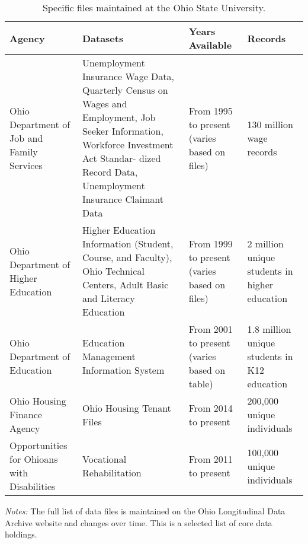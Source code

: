 \begin{table}[t]
\caption{\label{tab:oldatable1}Specific files maintained at the Ohio State University.}\vspace{-2pt}
\fontsize{9}{10}\selectfont
\begin{tabularx}{1\textwidth}{YP{3.7cm}YY}
\toprule
Agency & Datasets & Years Available & Records\\
\midrule
Ohio Department of Job and Family Services& Unemployment Insurance Wage Data, Quarterly Census on Wages and Employment, Job Seeker Information, Workforce Investment Act Standar- dized Record Data, Unemployment Insurance Claimant Data & From 1995 to present (varies based on files) & 130 million wage records\\
Ohio Department of Higher Education & Higher Education Information (Student, Course, and Faculty), Ohio Technical Centers, Adult Basic and Literacy Education & From 1999 to present (varies based on files) & 2 million unique students in higher education\\
Ohio Department of Education & Education Management Information System & From 2001 to present (varies based on table) & 1.8 million unique students in K12 education\\
Ohio Housing Finance Agency & Ohio Housing Tenant Files & From 2014 to present & 200,000 unique individuals\\
Opportunities for Ohioans with Disabilities & Vocational Rehabilitation & From 2011 to present & 100,000 unique individuals\\
\bottomrule
\end{tabularx}
\vspace{1pt}

  
{\footnotesize \textit{Notes:} The full list of data files is maintained on the Ohio Longitudinal Data Archive website and changes over time. This is a selected list of core data holdings.}
\end{table}
